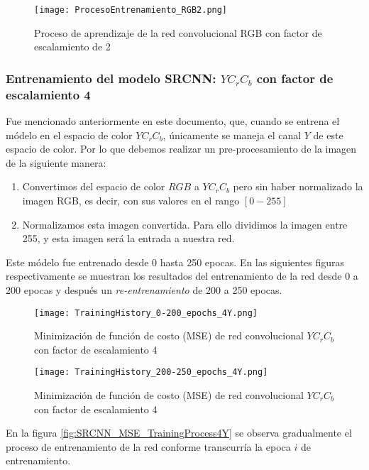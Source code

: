 \begin{figure}[H]
    \centering
    \texttt{[image: ProcesoEntrenamiento\_RGB2.png]}
    \caption{Proceso de aprendizaje de la red convolucional RGB con factor de escalamiento de 2}
    \label{fig:SRCNN_MSE_TrainingProcess2RGB}
\end{figure}

\subsubsection{Entrenamiento del modelo SRCNN: $YC_rC_b$ con factor de escalamiento 4}
Fue mencionado anteriormente en este documento, que, cuando se entrena el módelo en el espacio de color $YC_rC_b$, únicamente se
maneja el canal $Y$ de este espacio de color. Por lo que debemos realizar un pre-procesamiento de la imagen de la siguiente manera:
\begin{enumerate}
    \item Convertimos del espacio de color $RGB$ a $YC_rC_b$ pero sin haber normalizado la imagen RGB, es decir, con sus valores en el rango $[0-255]$
    \item Normalizamos esta imagen convertida. Para ello dividimos la imagen entre 255, y esta imagen será la entrada a nuestra red.
\end{enumerate}
Este módelo fue entrenado desde 0 hasta 250 epocas. En las siguientes figuras respectivamente se muestran los resultados del
entrenamiento de la red desde 0 a 200 epocas y después un \emph{re-entrenamiento} de 200 a 250 epocas.

\begin{figure}[H]
    \centering
    \texttt{[image: TrainingHistory\_0-200\_epochs\_4Y.png]}
    \caption{Minimización de función de costo (MSE) de red convolucional $YC_rC_b$ con factor de escalamiento 4}
    \label{fig:SRCNN_MSE_TrainingLoss4Y1}
\end{figure}

\begin{figure}[H]
    \centering
    \texttt{[image: TrainingHistory\_200-250\_epochs\_4Y.png]}
    \caption{Minimización de función de costo (MSE) de red convolucional $YC_rC_b$ con factor de escalamiento 4}
    \label{fig:SRCNN_MSE_TrainingLoss4Y2}
\end{figure}

En la figura \ref{fig:SRCNN_MSE_TrainingProcess4Y} se observa gradualmente el proceso de entrenamiento de la red conforme
transcurría la epoca $i$ de entrenamiento.

